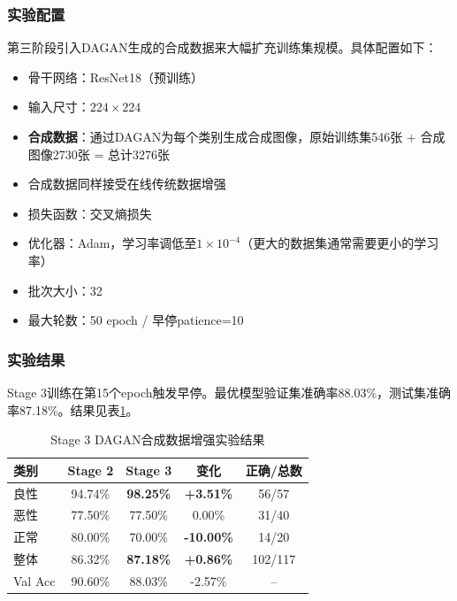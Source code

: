 \subsubsection{实验配置}

第三阶段引入DAGAN生成的合成数据来大幅扩充训练集规模。具体配置如下：

\begin{itemize}
    \item 骨干网络：ResNet18（预训练）
    \item 输入尺寸：$224\times224$
    \item \textbf{合成数据}：通过DAGAN为每个类别生成合成图像，原始训练集546张 + 合成图像2730张 = 总计3276张
    \item 合成数据同样接受在线传统数据增强
    \item 损失函数：交叉熵损失
    \item 优化器：Adam，学习率调低至$1\times10^{-4}$（更大的数据集通常需要更小的学习率）
    \item 批次大小：32
    \item 最大轮数：50 epoch / 早停patience=10
\end{itemize}

\subsubsection{实验结果}

Stage 3训练在第15个epoch触发早停。最优模型验证集准确率88.03\%，测试集准确率87.18\%。结果见表\ref{tbl:stage3_results}。

\begin{table}[htb]
    \centering
    \caption{Stage 3 DAGAN合成数据增强实验结果}
    \label{tbl:stage3_results}
    \begin{tabular}{lcccc}
        \toprule
        类别 & Stage 2 & Stage 3 & 变化 & 正确/总数 \\
        \midrule
        良性    & 94.74\% & \textbf{98.25\%} & \textbf{+3.51\%} & 56/57 \\
        恶性    & 77.50\% & 77.50\% & 0.00\% & 31/40 \\
        正常    & 80.00\% & 70.00\% & \textbf{-10.00\%} & 14/20 \\
        \midrule
        整体    & 86.32\% & \textbf{87.18\%} & \textbf{+0.86\%} & 102/117 \\
        Val Acc & 90.60\% & 88.03\% & -2.57\% & -- \\
        \bottomrule
    \end{tabular}
\end{table}

